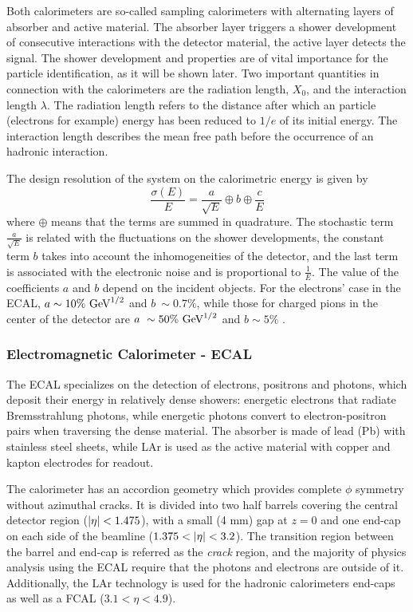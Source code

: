 Both calorimeters are so-called sampling calorimeters with alternating layers of absorber and active material. The absorber layer triggers a shower development of consecutive interactions with the detector material, the active layer detects the signal.
The shower development and properties are of vital importance for the particle identification, as it will be shown later.
Two important quantities in connection with the calorimeters are the radiation length, $X_0$, and the interaction length $\lambda$. The radiation length refers to the distance after which an particle (electrons for example) energy has been reduced to \(1/e\) of its initial energy. The interaction length describes the mean free path before the occurrence of an hadronic interaction.

The design resolution of the system on the calorimetric energy is given by
\begin{equation}
    \frac{\sigma(E)}{E} = 
    \frac{a}{\sqrt{E}} \oplus b \oplus \frac{c}{E}
\end{equation}
where \(\oplus\) means that the terms are summed in quadrature. The stochastic term \(\frac{a}{\sqrt{E}}\) is related with the fluctuations on the shower developments, the constant term \(b\) takes into account the inhomogeneities of the detector, and the last term is associated with the electronic noise and is proportional to \(\frac{1}{E}\). The value of the coefficients \(a\) and \(b\) depend on the incident objects. For the electrons' case in the \ac{ECAL}, \(a\sim 10\%~\text{GeV}^{1/2}\) and \(b~\sim 0.7\%\), while those for charged pions in the center of the detector are \(a~\sim50\%~\text{GeV}^{1/2}\) and \(b\sim5\%\) \cite{ATLAS-Calorimeters-PerformanceRun2}.



\subsubsection{Electromagnetic Calorimeter - ECAL}
\label{subsubsec:atlas:atlas:cals:ecal}

The \ac{ECAL} specializes on the detection of electrons, positrons and photons, which deposit their energy in relatively dense showers: energetic electrons that radiate Bremsstrahlung photons, while energetic photons convert to electron-positron pairs when traversing the dense material.
The absorber is made of lead (Pb) with stainless steel sheets, while \ac{LAr} is used as the active material with copper and kapton electrodes for readout.


The calorimeter has an accordion geometry which provides complete \(\phi\) symmetry without azimuthal cracks. 
It is divided into two half barrels covering the central detector region (\(|\eta|<1.475\)), with a small (4 mm) gap at $z = 0$ and one end-cap on each side of the beamline (\(1.375<\abseta<3.2\)).
The transition region between the barrel and end-cap is referred as the \textit{crack} region, and the majority of physics analysis using the \ac{ECAL} require that the photons and electrons are outside of it.
Additionally, the \ac{LAr} technology is used for the hadronic calorimeters end-caps as well as a \ac{FCAL} ($3.1 < \eta < 4.9$).

